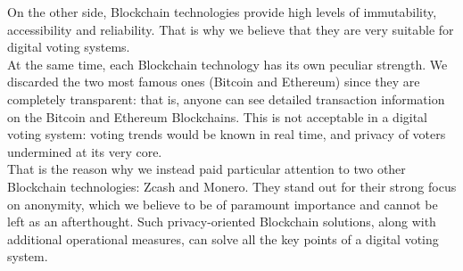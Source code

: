 \documentclass[10pt, letterpaper]{article}
\begin{document}
On the other side, Blockchain technologies provide high levels of immutability, accessibility and reliability. That is why we believe that they are very suitable for digital voting systems.\\
At the same time, each Blockchain technology has its own peculiar strength. We discarded the two most famous ones (Bitcoin and Ethereum) since they are completely transparent: that is, anyone can see detailed transaction information on the Bitcoin and Ethereum Blockchains. This is not acceptable in a digital voting system: voting trends would be known in real time, and privacy of voters undermined at its very core.\\
That is the reason why we instead paid particular attention to two other Blockchain technologies: Zcash and Monero. They stand out for their strong focus on anonymity, which we believe to be of paramount importance and cannot be left as an afterthought. Such privacy-oriented Blockchain solutions, along with additional operational measures, can solve all the key points of a digital voting system.
\bigskip
\end{document}
